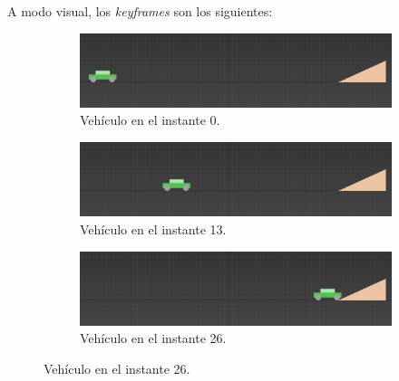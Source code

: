 \documentclass{article}
\begin{document}
A modo visual, los \textit{keyframes} son los siguientes:



\begin{figure}[H]
    \centering
    \begin{subfigure}[H]{0.48\textwidth}
        \centering
        \includegraphics[width=\textwidth]{imagenes/Ejercicio2/keyframes/0.png}
        \caption{Vehículo en el instante 0.}
    \end{subfigure}
    \hfill
    \begin{subfigure}[H]{0.48\textwidth}
        \centering
        \includegraphics[width=\textwidth]{imagenes/Ejercicio2/keyframes/13.png}
        \caption{Vehículo en el instante 13.}
    \end{subfigure}
    \par\bigskip
    \begin{subfigure}[H]{0.48\textwidth}
        \centering
        \includegraphics[width=\textwidth]{imagenes/Ejercicio2/keyframes/26.png}
        \caption{Vehículo en el instante 26.}
    \end{subfigure}

\end{figure}
\end{document}
